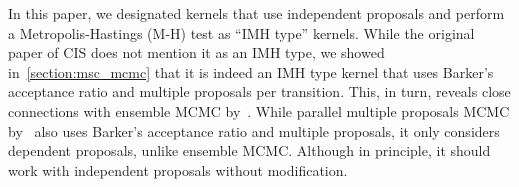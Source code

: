 In this paper, we designated kernels that use independent proposals and perform a Metropolis-Hastings (M-H) test as ``IMH type'' kernels.
While the original paper of CIS does not mention it as an IMH type, we showed in~\cref{section:msc_mcmc} that it is indeed an IMH type kernel that uses Barker's acceptance ratio and multiple proposals per transition.
This, in turn, reveals close connections with ensemble MCMC by~\citet{neal_mcmc_2011a}.
While parallel multiple proposals MCMC by~\citet{austad_parallel_2007} also uses Barker's acceptance ratio and multiple proposals, it only considers dependent proposals, unlike ensemble MCMC.
Although in principle, it should work with independent proposals without modification.

